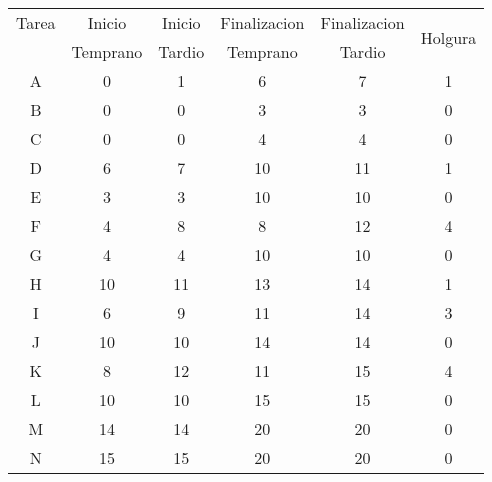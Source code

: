 \begin{tabular}{cccccc}
Tarea  & Inicio & Inicio & Finalizacion & Finalizacion & \multirow{2}[1]{*}{Holgura} \\
       & Temprano & Tardio & Temprano & Tardio &  \bigstrut[b]\\
\hline
\hline
A      & 0      & 1      & 6      & 7      & 1 \bigstrut[t]\\
B      & 0      & 0      & 3      & 3      & 0 \\
C      & 0      & 0      & 4      & 4      & 0 \\
D      & 6      & 7      & 10     & 11     & 1 \\
E      & 3      & 3      & 10     & 10     & 0 \\
F      & 4      & 8      & 8      & 12     & 4 \\
G      & 4      & 4      & 10     & 10     & 0 \\
H      & 10     & 11     & 13     & 14     & 1 \\
I      & 6      & 9      & 11     & 14     & 3 \\
J      & 10     & 10     & 14     & 14     & 0 \\
K      & 8      & 12     & 11     & 15     & 4 \\
L      & 10     & 10     & 15     & 15     & 0 \\
M      & 14     & 14     & 20     & 20     & 0 \\
N      & 15     & 15     & 20     & 20     & 0 \bigstrut[b]\\
\hline
\hline
\end{tabular}%
